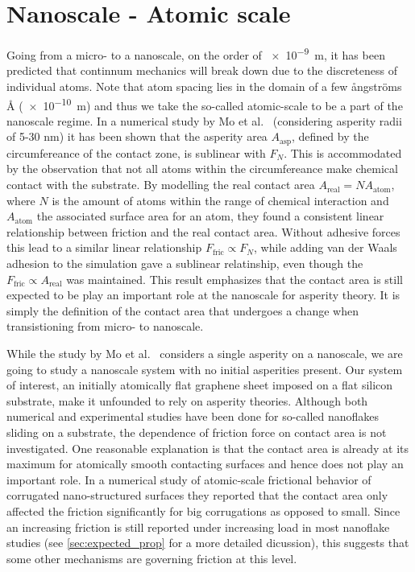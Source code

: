 \section{Nanoscale - Atomic scale}
Going from a micro- to a nanoscale, on the order of \SI{e-9}{m}, it has been
predicted that continnum mechanics will break down \cite{luan_breakdown_2005}
due to the discreteness of individual atoms. Note that atom spacing lies in the
domain of a few ångströms Å (\SI{e-10}{m}) and thus we take the so-called atomic-scale to be a part of the nanoscale regime. In a numerical
study by Mo et al.\ \cite{mo_friction_2009} (considering asperity radii of 5-30
nm) it has been shown that the asperity area $A_{\text{asp}}$, defined by the
circumfereance of the contact zone, is sublinear with
$F_N$. This is accommodated by the observation that not all atoms within the
circumfereance make chemical contact with the substrate. By
modelling the real contact area $A_{\text{real}} = NA_{\text{atom}}$, where $N$ is the amount of atoms within the range of chemical interaction and
$A_{\text{atom}}$ the associated surface area for an atom, they found a consistent
linear relationship between friction and the real contact area. Without adhesive
forces this lead to a similar linear relationship $F_{\text{fric}} \propto F_N$,
while adding van der Waals adhesion to the simulation gave a sublinear
relatinship, even though the $F_{\text{fric}} \propto A_{\text{real}}$ was
maintained. This result emphasizes that the contact area is still expected to be play an important role at the nanoscale for asperity theory. It is simply the definition of the contact area that undergoes a change when transistioning from micro- to nanoscale. 

While the study by Mo et al.\ \cite{mo_friction_2009} considers a single
asperity on a nanoscale, we are going to study a nanoscale system with no
initial asperities present. Our system of interest, an initially atomically flat graphene sheet imposed on a flat silicon substrate, make it unfounded to rely on asperity theories. Although both numerical \cite{zhu_study_2018}\cite{ma12091425}\cite{bonelli_atomistic_2009} and experimental \cite[2005]{DIENWIEBEL2005197}\cite{feng_superlubric_2013} studies have been done for so-called nanoflakes
sliding on a substrate, the dependence of friction force on contact area is not investigated.  One reasonable explanation is that the contact area is already at its maximum for atomically smooth contacting surfaces and hence does not play an important role. In a numerical study of atomic-scale frictional behavior of corrugated nano-structured surfaces \cite{C2NR30691C} they reported that the contact area only affected the friction significantly for big corrugations as opposed to small. Since an increasing friction is still reported under increasing load in most nanoflake studies (see
\cref{sec:expected_prop} for a more detailed dicussion), this suggests
that some other mechanisms are governing friction at this level. 

